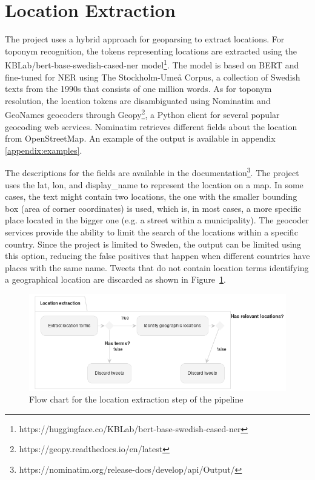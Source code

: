 \section{Location Extraction}

The project uses a hybrid approach for geoparsing to extract locations. For toponym recognition, the
tokens representing locations are extracted using the KBLab/bert-base-swedish-cased-ner
model\footnote{https://huggingface.co/KBLab/bert-base-swedish-cased-ner}. The model is based on BERT
and fine-tuned for \ac{NER} using The Stockholm-Umeå Corpus, a collection of Swedish texts from the
1990s that consists of one million words. As for toponym resolution, the location tokens are
disambiguated using Nominatim and GeoNames geocoders through
Geopy\footnote{https://geopy.readthedocs.io/en/latest}, a Python client for several
popular geocoding web services. Nominatim retrieves different fields about the
location from OpenStreetMap. An example of the output is available in appendix
\ref{appendix:examples}.


The descriptions for the fields are available in the
documentation\footnote{https://nominatim.org/release-docs/develop/api/Output/}. The project uses
the lat, lon, and display\_name to represent the location on a map. In some cases, the text might
contain two locations, the one with the smaller bounding box (area of corner coordinates) is used,
which is, in most cases, a more specific place located in the bigger one (e.g. a street within a
municipality). The geocoder services provide the ability to limit the search of the locations
within a specific country. Since the project is limited to Sweden, the output can be limited using
this option, reducing the false positives that happen when different countries have places with
the same name. Tweets that do not contain location terms identifying a geographical
location are discarded as shown in Figure~\ref{fig:flow_chart_location_extraction}.

\begin{figure}[H]
  \begin{center}
    \includegraphics[width=\columnwidth]{./images/location_extraction.png}
  \end{center}
  \caption{Flow chart for the location extraction step of the pipeline}
  \label{fig:flow_chart_location_extraction}
\end{figure}


